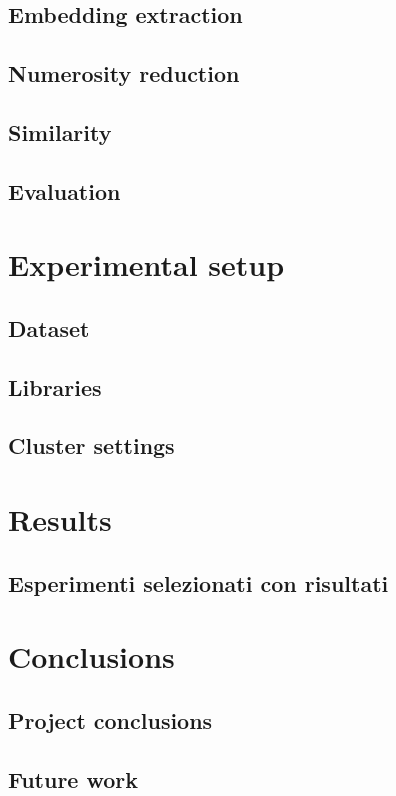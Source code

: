 \documentclass{oist}
\begin{document}
\section{Embedding extraction}
\section{Numerosity reduction}
\section{Similarity}
\section{Evaluation}

\chapter{Experimental setup}
\section{Dataset}
\section{Libraries}
\section{Cluster settings}

\chapter{Results}
\section{Esperimenti selezionati con risultati}

\chapter{Conclusions}
\section{Project conclusions}
\section{Future work}

\appendix


\printbibliography
{}
\end{document}
